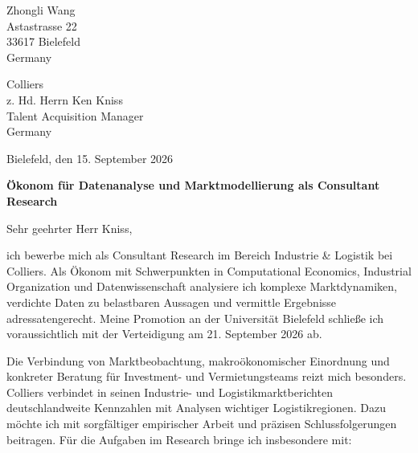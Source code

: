 \documentclass[11pt]{article}
\begin{document}
\begin{flushright}
Zhongli Wang \\
Astastrasse 22 \\
33617 Bielefeld \\
Germany
\end{flushright}

\vspace{-0.25cm}

\noindent
Colliers \\
z. Hd. Herrn Ken Kniss \\
Talent Acquisition Manager \\
Germany

\vspace{0.12cm}

\noindent Bielefeld, den 15. September 2026

\vspace{0.12cm}

\noindent
\textbf{Ökonom für Datenanalyse und Marktmodellierung als Consultant Research}

\vspace{0.08cm}

\noindent Sehr geehrter Herr Kniss,

ich bewerbe mich als Consultant Research im Bereich Industrie \& Logistik bei Colliers. 
Als Ökonom mit Schwerpunkten in Computational Economics, Industrial Organization und Datenwissenschaft analysiere ich komplexe Marktdynamiken, 
verdichte Daten zu belastbaren Aussagen und vermittle Ergebnisse adressatengerecht. 
Meine Promotion an der Universität Bielefeld schließe ich voraussichtlich mit der Verteidigung am 21. September 2026 ab.

Die Verbindung von Marktbeobachtung, makroökonomischer Einordnung und konkreter Beratung für Investment- und Vermietungsteams reizt mich besonders. 
Colliers verbindet in seinen Industrie- und Logistikmarktberichten deutschlandweite Kennzahlen mit Analysen wichtiger Logistikregionen. 
Dazu möchte ich mit sorgfältiger empirischer Arbeit und präzisen Schlussfolgerungen beitragen.
Für die Aufgaben im Research bringe ich insbesondere mit:
\end{document}
